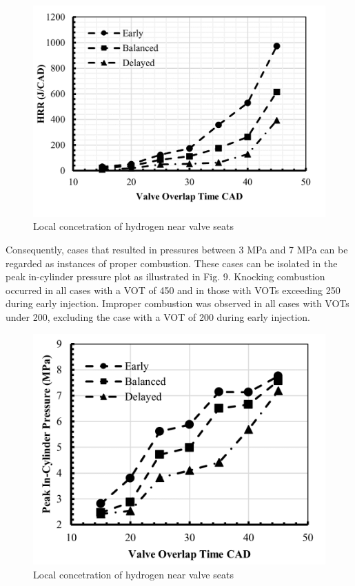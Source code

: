 \documentclass[conference]{IEEEtran}
\begin{document}
    \begin{figure}[htbp]
        \centerline{\includegraphics{plots and graphs/8.png}}
        \caption{Local concetration of hydrogen near valve seats}
        \label{plt_8}
        \end{figure}

Consequently, cases that resulted in pressures between 3 MPa and 7 MPa can be regarded as instances of proper combustion. These cases can be isolated in the peak in-cylinder pressure plot as illustrated in Fig. 9. Knocking combustion occurred in all cases with a VOT of 450 and in those with VOTs exceeding 250 during early injection. Improper combustion was observed in all cases with VOTs under 200, excluding the case with a VOT of 200 during early injection.\\

\begin{figure}[htbp]
    \centerline{\includegraphics{plots and graphs/9.png}}
    \caption{Local concetration of hydrogen near valve seats}
    \label{plt_9}
    \end{figure}
\end{document}
